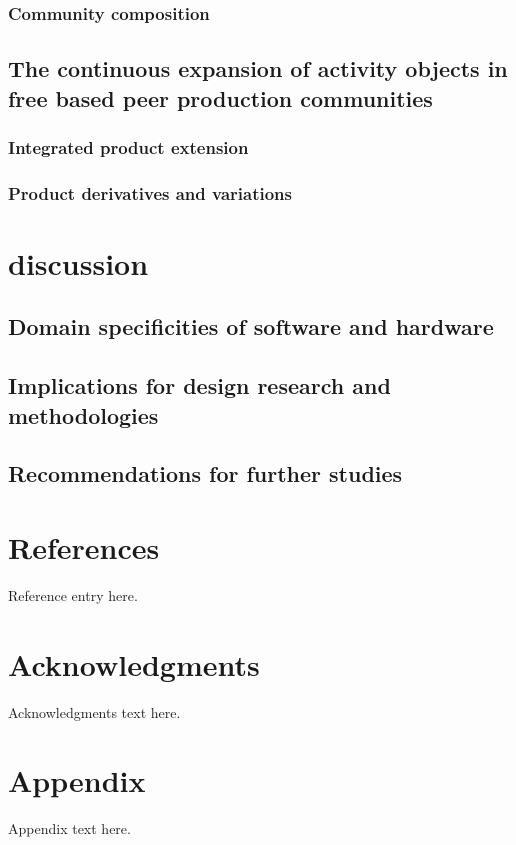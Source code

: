 \documentclass{ICED-Paper}%
\begin{document}
\subsubsection{Community composition}

\subsection{The continuous expansion of activity objects in free based peer production communities}

\subsubsection{Integrated product extension}

\subsubsection{Product derivatives and variations}

\section{discussion}
\subsection{Domain specificities of software and hardware}

\subsection{Implications for design research and methodologies}

\subsection{Recommendations for further studies}

\section*{References}

\begin{thebibliography}

Reference entry here.

\end{thebibliography}

\section*{Acknowledgments}

Acknowledgments text here.

\appendix

\section*{Appendix}

Appendix text here.
\end{document}
